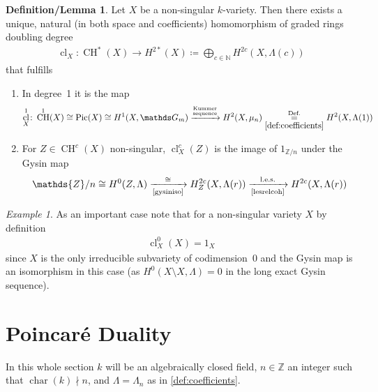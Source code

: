 \documentclass[english]{scrartcl}
\theoremstyle{definition}
\newtheorem{DefLem}[Def]{Definition/Lemma}
\theoremstyle{remark}
\newtheorem{Ex}[Def]{Example}
\newcommand*{\N}{\mathds{N}}
\newcommand*{\Z}{\mathds{Z}}
\newcommand*{\Zmod}[1]{\Z/#1} %
\DeclareMathOperator{\Char}{char} %
\DeclareMathOperator{\CH}{CH} %
\DeclareMathOperator{\Pic}{Pic} %
\DeclareMathOperator{\CL}{cl} %
\newcommand*{\one}[1]{{1_{#1}}}%
\begin{document}
\begin{DefLem}\label{def:cycleclassmap}
  Let $X$ be a non-singular $k$-variety.
  Then there exists a unique, natural (in both space and coefficients)
  homomorphism of graded rings doubling degree
  \begin{gather*}
    \CL_X\colon \CH^*(X)\rightarrow H^{2*}(X)\coloneqq
    \bigoplus_{c\in\N} H^{2c}(X,\Lambda(c))
  \end{gather*}
  that fulfills
  \begin{enumerate}
  \item In degree~1 it is the map
    \begin{gather*}
      \CL_X^1\colon
      \CH^1(X)\cong \Pic(X)\cong H^1(X,\mathds G_m)
      \xrightarrow{\footnotesize\substack{\text{Kummer}\\\text{sequence}}}
      H^2(X,\mu_n)
      \overset{\text{Def.}}{\underset{\ref{def:coefficients}}{=}}
      H^2(X,\Lambda(1))
    \end{gather*}
  \item For $Z\in\CH^c(X)$ non-singular, $\CL_X^c(Z)$ is the image of
    $1_{\Zmod{n}}$ under the Gysin map
    \begin{gather*}
      \Zmod{n} \cong H^0(Z,\Lambda)
      \xrightarrow[\text{\ref{gysiniso}}]{\cong}
      H_Z^{2c}(X,\Lambda(r))
      \xrightarrow[\text{\ref{lesrelcoh}}]{\text{l.e.s.}}
      H^{2c}(X,\Lambda(r))
    \end{gather*}
  \end{enumerate}
\end{DefLem}

\begin{Ex}\label{ex:clxx}
  As an important case note that for a non-singular variety $X$
  by definition
  \begin{gather*}
    \CL_{X}^0(X)=\one{X}
  \end{gather*}
  since $X$ is the only irreducible
  subvariety of codimension~$0$ and the Gysin map is an isomorphism in
  this case (as $H^0(X\setminus X,\Lambda)=0$ in the long exact Gysin
  sequence).
\end{Ex}

\section{Poincaré Duality}
In this whole section $k$ will be an algebraically closed field,
$n\in\Z$ an integer such that $\Char(k)\nmid n$,
and $\Lambda=\Lambda_n$ as in \ref{def:coefficients}.
\end{document}
